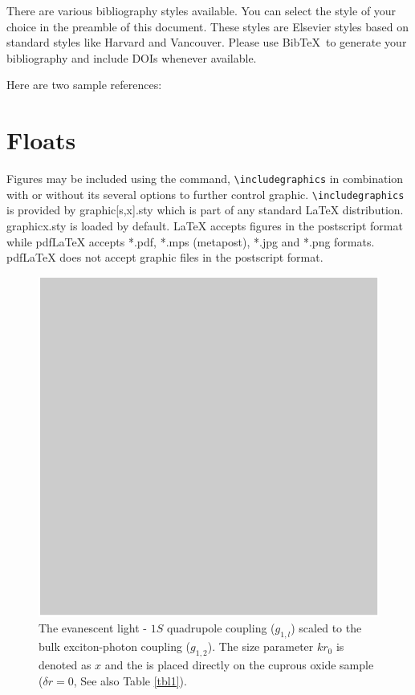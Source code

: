 \documentclass[a4paper,fleqn]{cas-sc}
\begin{document}
There are various bibliography styles available. You can select the
style of your choice in the preamble of this document. These styles are
Elsevier styles based on standard styles like Harvard and Vancouver.
Please use Bib\TeX\ to generate your bibliography and include DOIs
whenever available.

Here are two sample references: 
\cite{XUDONG:1999}
\cite{XUDONG:1999,FAN:1999}
\cite{XUDONG:1999,MIYAZAKI:2000}

\section{Floats}
{Figures} may be included using the command, \verb+\includegraphics+ in
combination with or without its several options to further control
graphic. \verb+\includegraphics+ is provided by {graphic[s,x].sty}
which is part of any standard \LaTeX{} distribution.
{graphicx.sty} is loaded by default. \LaTeX{} accepts figures in
the postscript format while pdf\LaTeX{} accepts {*.pdf},
{*.mps} (metapost), {*.jpg} and {*.png} formats. 
pdf\LaTeX{} does not accept graphic files in the postscript format. 

\begin{figure}
	\centering
		\includegraphics[scale=.75]{Fig1.pdf}
	\caption{The evanescent light - $1S$ quadrupole coupling
	($g_{1,l}$) scaled to the bulk exciton-photon coupling
	($g_{1,2}$). The size parameter $kr_{0}$ is denoted as $x$ and
	the \PMS is placed directly on the cuprous oxide sample ($\delta
	r=0$, See also Table \protect\ref{tbl1}).}
	\label{FIG:1}
\end{figure}
\end{document}
